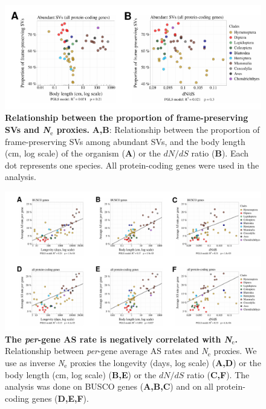 \begin{figure}[t]   
    \begin{center}                                                                       
        \includegraphics[width=\textwidth] {Figure9_supp.pdf}
    \end{center}                                                                       
    \caption[Relationship between the proportion of frame-preserving SVs and \textit{N}$_{\text{e}}$ proxies]{\textbf{Relationship between the proportion of frame-preserving SVs and \textit{N}$_{\text{e}}$ proxies.} \textbf{A,B}: Relationship between the proportion of frame-preserving SVs among abundant SVs, and the body length (cm, log scale) of the organism (\textbf{A}) or the ${dN}/{dS}$ ratio (\textbf{B}). Each dot represents one species. All protein-coding genes were used in the analysis.}
    \label{supp_fig:AS9}
\end{figure}


\begin{figure}[t]   
    \begin{center}                                                                       
        \includegraphics[width=\textwidth] {Figure10_supp.pdf}
    \end{center}                                                                       
    \caption[The \textit{per}-gene AS rate is negatively correlated with \textit{N}$_{\text{e}}$]{\textbf{The \textit{per}-gene AS rate is negatively correlated with \textit{N}$_{\text{e}}$.} Relationship between \textit{per}-gene average AS rates and \textit{N}$_{\text{e}}$ proxies. We use as inverse \textit{N}$_{\text{e}}$ proxies the longevity (days, log scale) (\textbf{A,D}) or the body length (cm, log scale) (\textbf{B,E}) or the ${dN}/{dS}$ ratio (\textbf{C,F}). The analysis was done on BUSCO genes (\textbf{A,B,C}) and on all protein-coding genes (\textbf{D,E,F}).}
    \label{supp_fig:AS10}
\end{figure}

